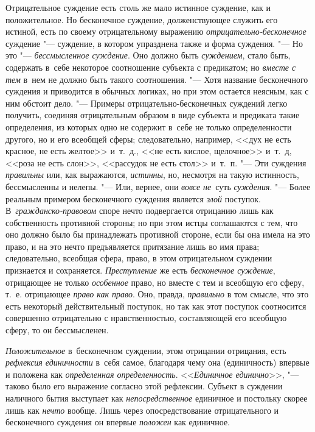 Отрицательное суждение есть столь же мало истинное суждение,
как и положительное. Но бесконечное суждение, долженствующее служить его
истиной, есть по своему отрицательному выражению {\em отрицательно-бесконечное}
суждение "--- суждение, в котором упразднена также и форма суждения. "--- Но
это "--- {\em бессмысленное суждение}. Оно должно быть {\em суждением}, стало
быть, содержать в~себе некоторое соотношение субъекта с предикатом; но
{\em вместе с тем} в~нем не должно быть такого соотношения. "--- Хотя название
бесконечного суждения и приводится в обычных логиках, но при этом остается
неясным, как с ним обстоит дело. "--- Примеры
отрицательно-бесконечных суждений легко получить, соединяя отрицательным
образом в виде субъекта и предиката такие определения, из которых одно не
содержит в~себе не только определенности другого, но и его всеобщей сферы;
следовательно, например, <<дух не есть красное, не есть желтое>> и~т.~д., <<не
есть кислое, щелочное>> и~т.~д, <<роза не есть слон>>, <<рассудок не есть
стол>> и~т.~п. "--- Эти суждения {\em правильны} или, как выражаются,
{\em истинны}, но, несмотря на такую истинность, бессмысленны и нелепы. "---
Или, вернее, они {\em вовсе не}~суть {\em суждения}. "--- Более
реальным примером бесконечного суждения является
{\em злой} поступок. В~{\em гражданско-правовом}
споре нечто подвергается отрицанию лишь как собственность
противной стороны; но при этом истцы соглашаются с тем, что оно должно было
бы принадлежать противной стороне, если бы она имела на это право, и на это
нечто предъявляется притязание лишь во имя права; следовательно, всеобщая
сфера, право, в этом отрицательном суждении признается и сохраняется.
{\em Преступление} же есть {\em бесконечное суждение}, отрицающее не только
{\em особенное} право, но вместе с тем и всеобщую его сферу, т.~е. отрицающее
{\em право как право}. Оно, правда, {\em правильно} в том
смысле, что это есть некоторый действительный поступок, но так как этот
поступок соотносится совершенно отрицательно с нравственностью,
составляющей его всеобщую сферу, то он бессмысленен.

{\em Положительное} в~бесконечном суждении, этом отрицании отрицания, есть
{\em рефлексия единичности} в~себя самое, благодаря чему она (единичность)
впервые и положена как {\em определенная определенность}.
<<{\em Единичное единично}>>, "--- таково было его выражение согласно этой
рефлексии. Субъект в суждении наличного бытия выступает как
{\em непосредственное} единичное и постольку скорее лишь как {\em нечто}
вообще. Лишь через опосредствование отрицательного и бесконечного суждения
он впервые {\em положен} как единичное.

